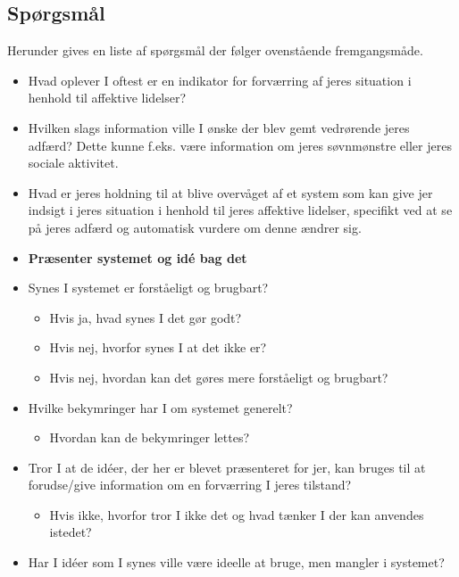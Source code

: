 \subsection*{Spørgsmål}
Herunder gives en liste af spørgsmål der følger ovenstående fremgangsmåde.

\begin{itemize}
\item Hvad oplever I oftest er en indikator for forværring af jeres situation i henhold til affektive lidelser?
\item Hvilken slags information ville I ønske der blev gemt vedrørende jeres adfærd? Dette kunne f.eks. være information om jeres søvnmønstre eller jeres sociale aktivitet.
\item Hvad er jeres holdning til at blive overvåget af et system som kan give jer indsigt i jeres situation i henhold til jeres affektive lidelser, specifikt ved at se på jeres adfærd og automatisk vurdere om denne ændrer sig.
\item \textbf{Præsenter systemet og idé bag det}
\item Synes I systemet er forståeligt og brugbart?
	   \begin{itemize}
	   \item Hvis ja, hvad synes I det gør godt?
	   \item Hvis nej, hvorfor synes I at det ikke er?
	   \item Hvis nej, hvordan kan det gøres mere forståeligt og brugbart?
	   \end{itemize}
\item Hvilke bekymringer har I om systemet generelt?
	  \begin{itemize}
	  \item Hvordan kan de bekymringer lettes?
	  \end{itemize}
\item Tror I at de idéer, der her er blevet præsenteret for jer, kan bruges til at forudse/give information om en forværring I jeres tilstand?
	   \begin{itemize}
	   \item Hvis ikke, hvorfor tror I ikke det og hvad tænker I der kan anvendes istedet?
	   \end{itemize}
\item Har I idéer som I synes ville være ideelle at bruge, men mangler i systemet?
\end{itemize}